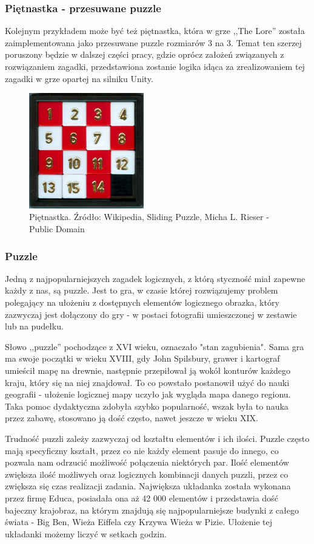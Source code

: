 \documentclass[oneside,polski,logo]{amuthesis}
\begin{document}
\subsubsection{Piętnastka - przesuwane puzzle}
\par Kolejnym przykładem może być też piętnastka, która w grze ,,The Lore'' została zaimplementowana jako przesuwane puzzle rozmiarów 3 na 3. Temat ten szerzej poruszony będzie w dalszej części pracy, gdzie oprócz założeń związanych z rozwiązaniem zagadki, przedstawiona zostanie logika idąca za zrealizowaniem tej zagadki w grze opartej na silniku Unity. 
\begin{figure}[h]
	\centering
	\includegraphics[width=5cm]{images/tyrek/przesuwane-puzzle.jpg}
	\caption{Piętnastka. Źródło: Wikipedia, Sliding Puzzle, Micha L. Rieser - Public Domain}
\end{figure}

\subsubsection{Puzzle}
\par Jedną z najpopularniejszych zagadek logicznych, z którą styczność miał zapewne każdy z nas, są puzzle. Jest to gra, w czasie której rozwiązujemy problem polegający na ułożeniu z dostępnych elementów logicznego obrazka, który zazwyczaj jest dołączony do gry - w postaci fotografii umieszczonej w zestawie lub na pudełku.
 
Słowo ,,puzzle'' pochodzące z XVI wieku, oznaczało "stan zagubienia". Sama gra ma swoje początki w wieku XVIII, gdy John Spilsbury, grawer i kartograf umieścił mapę na drewnie, następnie przepiłował ją wokół konturów każdego kraju, który się na niej znajdował. To co powstało postanowił użyć do nauki geografii - ułożenie logicznej mapy uczyło jak wygląda mapa danego regionu. Taka pomoc dydaktyczna zdobyła szybko popularność, wszak była to nauka przez zabawę, stosowano ją dość często, nawet jeszcze w wieku XIX.  

Trudność puzzli zależy zazwyczaj od kształtu elementów i ich ilości. Puzzle często mają specyficzny kształt, przez co nie każdy element pasuje do innego, co pozwala nam odrzucić możliwość połączenia niektórych par. Ilość elementów zwiększa ilość możliwych oraz logicznych kombinacji danych puzzli, przez co zwiększa się czas realizacji zadania. Największa układanka została wykonana przez firmę Educa, posiadała ona aż 42 000 elementów i przedstawia dość bajeczny krajobraz, na którym znajdują się najpopularniejsze budynki z całego świata - Big Ben, Wieża Eiffela czy Krzywa Wieża w Pizie. Ułożenie tej układanki możemy liczyć w setkach godzin. \cite{puzzle}
\end{document}
